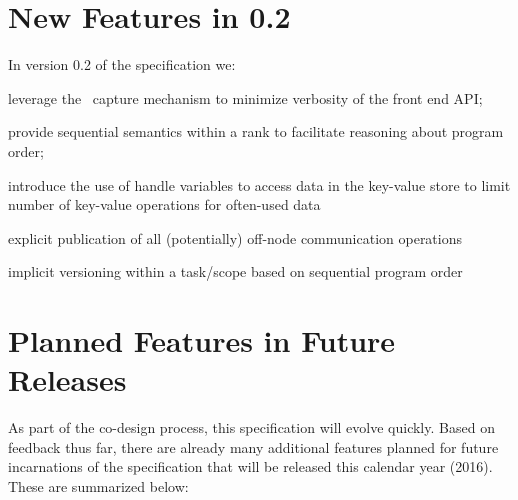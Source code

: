 \section{New Features in 0.2}
\label{sec:current}
In version 0.2 of the specification we:
  \begin{compactenum}
\item leverage the \CC\ \gls{capture} mechanism to minimize verbosity of the \gls{front end}
    \gls{API};  
\item provide \gls{sequential semantics} within a \gls{rank} to
    facilitate reasoning about program order; 
\item introduce the use of
    \gls{handle} variables to access data in the \gls{key-value store} to limit number of key-value operations for often-used data
\item explicit publication of all (potentially) off-node communication
operations
\item implicit versioning within a task/scope based on sequential program order    
    \end{compactenum}


\section{Planned Features in Future Releases}
\label{sec:future}

As part of the \gls{co-design} process, this specification will evolve quickly.
  Based on feedback thus far, there are already
many additional features planned for future incarnations of the specification that
will be released this calendar year (2016).  These are summarized below:

